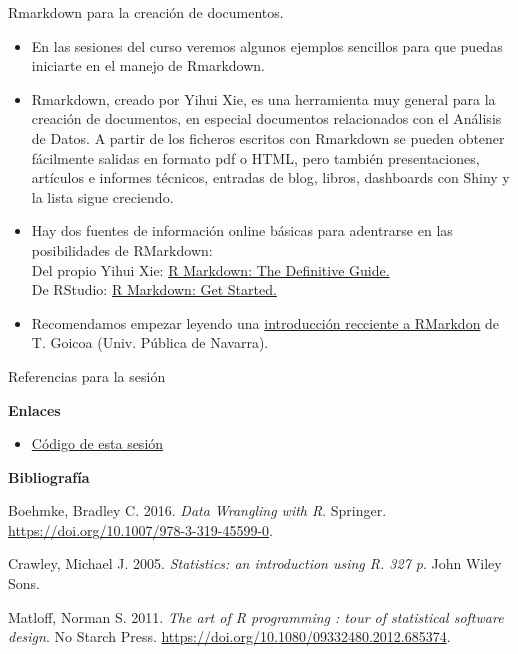 \documentclass[
  9pt,
  ignorenonframetext,
]{beamer}
\newcommand{\link}[2]{\textcolor{blue}{{\href{#1}{#2}}}}
\begin{document}
\begin{frame}{Rmarkdown para la creación de documentos.}
\protect\hypertarget{rmarkdown-para-la-creacion-de-documentos.}{}

\begin{itemize}
\item
  En las sesiones del curso veremos algunos ejemplos sencillos para que
  puedas iniciarte en el manejo de Rmarkdown.
\item
  Rmarkdown, creado por Yihui Xie, es una herramienta muy general para
  la creación de documentos, en especial documentos relacionados con el
  Análisis de Datos. A partir de los ficheros escritos con Rmarkdown se
  pueden obtener fácilmente salidas en formato pdf o HTML, pero también
  presentaciones, artículos e informes técnicos, entradas de blog,
  libros, dashboards con Shiny y la lista sigue creciendo.
\item
  Hay dos fuentes de información online básicas para adentrarse en las
  posibilidades de RMarkdown:\\
  Del propio Yihui Xie:
  \link{https://bookdown.org/yihui/rmarkdown/}{R Markdown: The Definitive Guide.}\\
  De RStudio:
  \link{https://rmarkdown.rstudio.com/lesson-1.html}{R Markdown: Get Started.}
\item
  Recomendamos empezar leyendo una
  \link{http://www.unavarra.es/personal/tgoicoa/ESTADISTICA_RMarkdown_tomas/basicRmarkdown/index.html}{introducción recciente a RMarkdon}
  de T. Goicoa (Univ. Pública de Navarra).
\end{itemize}

\end{frame}

\begin{frame}{Referencias para la sesión}
\protect\hypertarget{referencias-para-la-sesion}{}

\textbf{Enlaces}

\begin{itemize}
\item
  \link{https://raw.githubusercontent.com/fernandosansegundo/MBDFME/master/scripts/05- InferenciaMediaUnaVariable.R}{Código de esta sesión}
\end{itemize}

\textbf{Bibliografía}

\hypertarget{refs}{}
\leavevmode\hypertarget{ref-Boehmke2016}{}%
Boehmke, Bradley C. 2016. \emph{Data Wrangling with R}. Springer.
\url{https://doi.org/10.1007/978-3-319-45599-0}.

\leavevmode\hypertarget{ref-crawley2005statistics}{}%
Crawley, Michael J. 2005. \emph{Statistics: an introduction using R. 327
p}. John Wiley Sons.

\leavevmode\hypertarget{ref-Matloff2011}{}%
Matloff, Norman S. 2011. \emph{The art of R programming : tour of
statistical software design}. No Starch Press.
\url{https://doi.org/10.1080/09332480.2012.685374}.

\end{frame}
\end{document}
